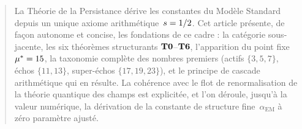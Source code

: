 



\maketitle

\begin{abstract}
\noindent
La Théorie de la Persistance dérive les constantes du Modèle Standard depuis un unique axiome arithmétique~$\sper=1/2$. Cet article présente, de façon autonome et concise, les fondations de ce cadre : la catégorie sous-jacente, les six théorèmes structurants $\Tzero$--$\Tsix$, l'apparition du point fixe~$\mustar=15$, la taxonomie complète des nombres premiers (actifs $\{3,5,7\}$, échos $\{11,13\}$, super-échos $\{17,19,23\}$), et le principe de cascade arithmétique qui en résulte. La cohérence avec le flot de renormalisation de la théorie quantique des champs est explicitée, et l'on déroule, jusqu'à la valeur numérique, la dérivation de la constante de structure fine~$\alpha_{\mathrm{EM}}$ à zéro paramètre ajusté.
\end{abstract}

\tableofcontents









\appendix


\printbibliography


